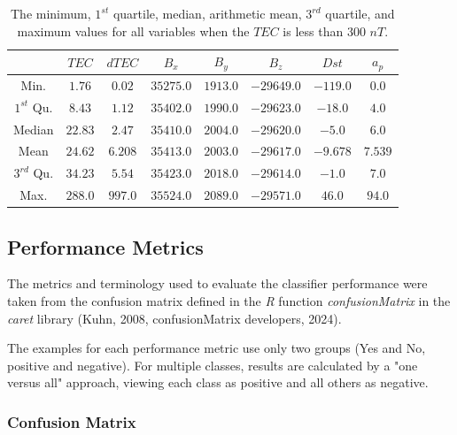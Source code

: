 \documentclass[sn-mathphys-num]{sn-jnl}%
\begin{document}
\begin{table}[!ht]
    \centering
    \caption{The minimum, $1^{st}$ quartile, median, arithmetic mean, $3^{rd}$ quartile, and maximum values for all variables when the $TEC$ is less than $300$ $nT$.}
    \label{tab:minmax}
        \begin{tabular}{|c|c|c|c|c|c|c|c|}
                \hline
                  & $TEC$ & $dTEC$ & $B_{x}$ & $B_{y}$ & $B_{z}$ & $Dst$ & $a_{p}$ \\ \hline
                Min. & $1.76$ & $0.02$ & $35275.0$ & $1913.0$ & $-29649.0$ & $-119.0$ & $0.0$ \\ \hline
                $1^{st}$ Qu. & $8.43$ & $1.12$ & $35402.0$ & $1990.0$ & $-29623.0$ & $-18.0$ & $4.0$ \\ \hline
                Median & $22.83$ & $2.47$ & $35410.0$ & $2004.0$ & $-29620.0$ & $-5.0$ & $6.0$ \\ \hline
                Mean & $24.62$ & $6.208$ & $35413.0$ & $2003.0$ & $-29617.0$ & $-9.678$ & $7.539$ \\ \hline
                $3^{rd}$ Qu. & $34.23$ & $5.54$ & $35423.0$ & $2018.0$ & $-29614.0$ & $-1.0$ & $7.0$ \\ \hline
                Max. & $288.0$ & $997.0$ & $35524.0$ & $2089.0$ & $-29571.0$ & $46.0$ & $94.0$ \\ \hline
        \end{tabular}
\end{table}

\subsection{Performance Metrics}

The metrics and terminology used to evaluate the classifier performance were taken from the confusion matrix defined in the \textit{R} function \textit{confusionMatrix} in the \textit{caret} library (Kuhn, 2008, confusionMatrix developers, 2024).

The examples for each performance metric use only two groups (Yes and No, positive and negative). For multiple classes, results are calculated by a "one versus all" approach, viewing each class as positive and all others as negative.

\subsubsection{Confusion Matrix}
\end{document}
